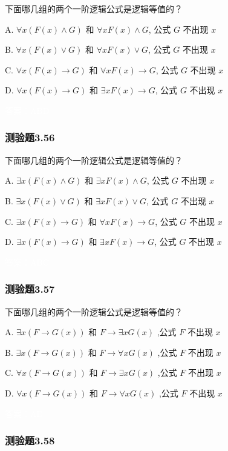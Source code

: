 \documentclass[UTF8, heading=true]{ctexart}
\begin{document}
下面哪几组的两个一阶逻辑公式是逻辑等值的？

A. $\forall x(F(x) \wedge G)$ 和 $\forall x F(x) \wedge G$, 公式 $G$ 不出现 $x$

B. $\forall x(F(x) \vee G)$ 和 $\forall x F(x) \vee G$, 公式 $G$ 不出现 $x$

C. $\forall x(F(x) \rightarrow G)$ 和 $\forall x F(x) \rightarrow G$, 公式 $G$ 不出现 $x$

D. $\forall x(F(x) \rightarrow G)$ 和 $\exists x F(x) \rightarrow G$, 公式 $G$ 不出现 $x$

\textcolor{white}{答案：ABD}

\subsubsection{测验题3.56}

下面哪几组的两个一阶逻辑公式是逻辑等值的？

A. $\exists x(F(x) \wedge G)$ 和 $\exists x F(x) \wedge G$, 公式 $G$ 不出现 $x$

B. $\exists x(F(x) \vee G)$ 和 $\exists x F(x) \vee G$, 公式 $G$ 不出现 $x$

C. $\exists x(F(x) \rightarrow G)$ 和 $\forall x F(x) \rightarrow G$, 公式 $G$ 不出现 $x$

D. $\exists x(F(x) \rightarrow G)$ 和 $\exists x F(x) \rightarrow G$, 公式 $G$ 不出现 $x$

\textcolor{white}{答案：ABC}

\subsubsection{测验题3.57}

下面哪几组的两个一阶逻辑公式是逻辑等值的？

A. $\exists x(F \rightarrow G(x))$ 和 $F \rightarrow \exists x G(x)$ ,公式 $F$ 不出现 $x$

B.
$\exists x(F \rightarrow G(x))$ 和 $F \rightarrow \forall x G(x)$ ,公式 $F$ 不出现 $x$

C.
$\forall x(F \rightarrow G(x))$ 和 $F \rightarrow \exists x G(x)$ ,公式 $F$ 不出现 $x$

D.
$\forall x(F \rightarrow G(x))$ 和 $F \rightarrow \forall x G(x)$ ,公式 $F$ 不出现 $x$

\textcolor{white}{答案：AD}

\subsubsection{测验题3.58}
\end{document}
